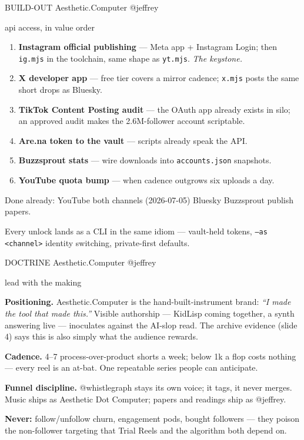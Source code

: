 \documentclass[12pt]{article}
\makeatletter
\newcommand{\ac}{Aesthetic\textcolor{acpink}{.}Computer}
\newenvironment{slide}[2]{%
  \clearpage
  {\footnotesize\color{acgray}\MakeUppercase{#1}\hfill}%
  {\footnotesize\color{acgray}\ac{} \textperiodcentered{} @jeffrey}\par
  \vspace{0.1em}
  {\acbold\fontsize{31pt}{35pt}\selectfont\color{acdark}#2\par}
  \vspace{0.9em}
  \large
}{%
  \vfill
  {\hfill\footnotesize\color{acgray}\thepage}%
}
\makeatother
\begin{document}
\begin{slide}{build-out}{api access, in value order}
\begin{enumerate}[leftmargin=2.2em, itemsep=0.55em]
  \item \textbf{Instagram official publishing} --- Meta app + Instagram Login; then
        \texttt{ig.mjs} in the toolchain, same shape as \texttt{yt.mjs}. \textit{The keystone.}
  \item \textbf{X developer app} --- free tier covers a mirror cadence;
        \texttt{x.mjs} posts the same short drops as Bluesky.
  \item \textbf{TikTok Content Posting audit} --- the OAuth app already exists in silo;
        an approved audit makes the 2.6M-follower account scriptable.
  \item \textbf{Are.na token to the vault} --- scripts already speak the API.
  \item \textbf{Buzzsprout stats} --- wire downloads into \texttt{accounts.json} snapshots.
  \item \textbf{YouTube quota bump} --- when cadence outgrows six uploads a day.
\end{enumerate}

\vspace{1em}
Done already: YouTube both channels (2026-07-05) \textperiodcentered{} Bluesky \textperiodcentered{}
Buzzsprout publish \textperiodcentered{} papers.

\vspace{0.6em}
Every unlock lands as a CLI in the same idiom --- vault-held tokens,
\texttt{--as <channel>} identity switching, private-first defaults.
\end{slide}

\begin{slide}{doctrine}{lead with the making}
\textbf{Positioning.} \ac{} is the hand-built-instrument brand: \textit{``I made the tool
that made this.''} Visible authorship --- KidLisp coming together, a synth answering live ---
inoculates against the AI-slop read. The archive evidence (slide 4) says this is also
simply what the audience rewards.

\vspace{0.9em}
\textbf{Cadence.} 4--7 process-over-product shorts a week; below 1k a flop costs nothing ---
every reel is an at-bat. One repeatable series people can anticipate.

\vspace{0.9em}
\textbf{Funnel discipline.} @whistlegraph stays its own voice; it tags, it never merges.
Music ships as Aesthetic Dot Computer; papers and readings ship as @jeffrey.

\vspace{0.9em}
\textbf{Never:} follow/unfollow churn, engagement pods, bought followers --- they poison
the non-follower targeting that Trial Reels and the algorithm both depend on.
\end{slide}
\end{document}
